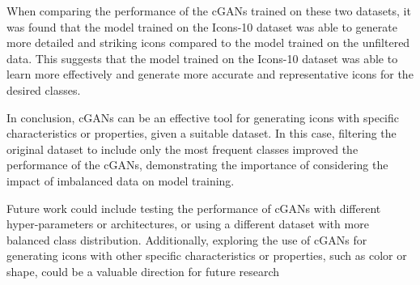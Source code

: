 \documentclass[conference]{IEEEtran}
\begin{document}
    When comparing the performance of the cGANs trained on these two datasets, it was found that the model trained on the Icons-10 dataset was able to generate more detailed and striking icons compared to the model trained on the unfiltered data.
    This suggests that the model trained on the Icons-10 dataset was able to learn more effectively and generate more accurate and representative icons for the desired classes.

    In conclusion, cGANs can be an effective tool for generating icons with specific characteristics or properties, given a suitable dataset.
    In this case, filtering the original dataset to include only the most frequent classes improved the performance of the cGANs, demonstrating the importance of considering the impact of imbalanced data on model training.

    Future work could include testing the performance of cGANs with different hyper-parameters or architectures, or using a different dataset with more balanced class distribution.
    Additionally, exploring the use of cGANs for generating icons with other specific characteristics or properties, such as color or shape, could be a valuable direction for future research

    
    
\end{document}

